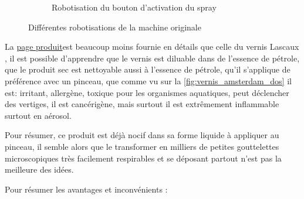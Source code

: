\begin{figure}[H]
\begin{subfigure}{.5\textwidth}
        \caption{Robotisation du bouton d'activation du spray}
        \label{fig:vernis_amsterdam_dos}
    \end{subfigure}
    \caption{Différentes robotisations de la machine originale}
    \label{fig:Vernis_amsterdam_photos}
\end{figure}
La \href{https://www.amsterdam-acrylics.com/fr/catalogue/amsterdam-protection/vernis-acrylique-brillant-flacon-250ml/}{page produit}\footnotemark est beaucoup moins fournie en détails que celle du vernis Lascaux
, il est possible d'apprendre que le vernis est diluable dans de l'essence de pétrole, que le produit
sec est nettoyable aussi à l'essence de pétrole, qu'il s'applique de préférence avec un pinceau, que comme vu sur la \autoref{fig:vernis_amsterdam_dos} il est: irritant, allergène, toxique pour les organismes aquatiques, peut déclencher
des vertiges, il est cancérigène, mais surtout il est extrêmement inflammable surtout en aérosol.

Pour résumer, ce produit est déjà nocif dans sa forme liquide à appliquer au pinceau, il semble alors que le transformer en milliers de petites gouttelettes microscopiques très facilement respirables et se déposant partout
n'est pas la meilleure des idées.

Pour résumer les avantages et inconvénients :

\begin{table}[H]
    \centering
    \caption{Résumé des avantages et inconvénients du vernis Amsterdam}
    \label{tab:Amsterdam_vernis}
\end{table}

